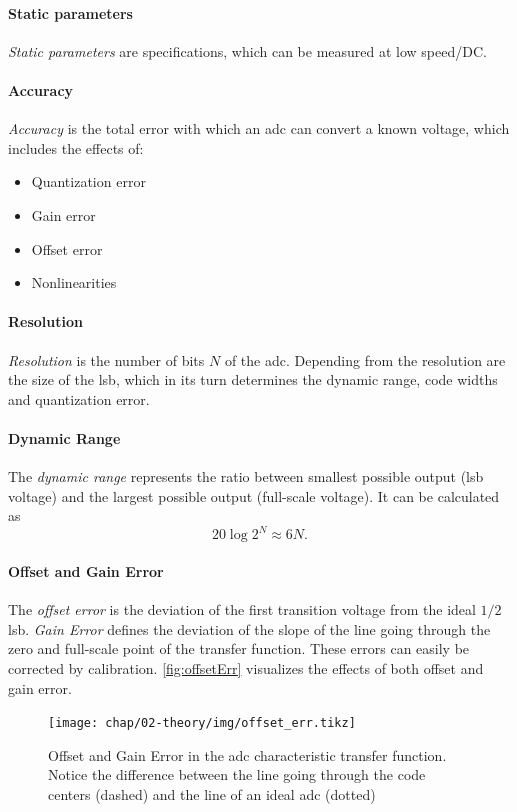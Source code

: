 \paragraph{Static parameters}
\textit{Static parameters} are specifications, which can be measured at low speed/DC. 
\paragraph{Accuracy}
\textit{Accuracy} is the total error with which an \gls{adc} can convert a known voltage, which includes the effects of:
\begin{itemize}[noitemsep]
	\item Quantization error
	\item Gain error
	\item Offset error
	\item Nonlinearities
\end{itemize}
\cite{Lundberg}
\paragraph{Resolution}
\textit{Resolution} is the number of bits $N$ of the \gls{adc}. Depending from the resolution are the size of the \gls{lsb}, which in its turn determines the dynamic range, code widths and quantization error.
\paragraph{Dynamic Range}
The \textit{dynamic range} represents the ratio between smallest possible output (\gls{lsb} voltage) and the largest possible output (full-scale voltage). It can be calculated as
\begin{equation}
	20 \log 2^{N} \approx 6N.
\end{equation}
\paragraph{Offset and Gain Error}
The \textit{offset error} is the deviation of the first transition voltage from the ideal $1/2$ \gls{lsb}. \textit{Gain Error} defines the deviation of the slope of the line going through the zero and full-scale point of the transfer function. These errors can easily be corrected by calibration. \autoref{fig:offsetErr} visualizes the effects of both offset and gain error. 
\begin{figure}[tbh]
	\centering
	\texttt{[image: chap/02-theory/img/offset\_err.tikz]}
	\caption[Effects of Offset and Fain error in ADC]{Offset and Gain Error in the \gls{adc} characteristic transfer function. Notice the difference between the line going through the code centers (dashed) and the line of an ideal \gls{adc} (dotted)}
	\label{fig:offsetErr}
\end{figure}
